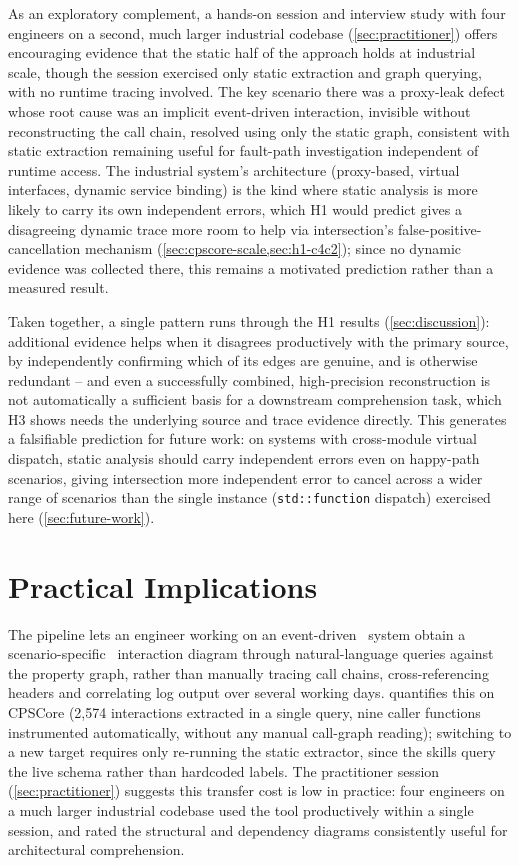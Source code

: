 As an exploratory complement, a hands-on session and interview study with
four engineers on a second, much larger industrial codebase
(\cref{sec:practitioner}) offers encouraging evidence that the static
half of the approach holds at industrial scale, though the session
exercised only static extraction and graph querying, with no runtime
tracing involved. The key scenario there was a proxy-leak defect whose
root cause was an implicit event-driven interaction, invisible without
reconstructing the call chain, resolved using only the static graph,
consistent with static extraction remaining useful for fault-path
investigation independent of runtime access. The industrial system's
architecture (proxy-based, virtual interfaces, dynamic service binding)
is the kind where static analysis is more likely to carry its own
independent errors, which H1 would predict gives a disagreeing dynamic
trace more room to help via intersection's false-positive-cancellation
mechanism (\cref{sec:cpscore-scale,sec:h1-c4c2}); since no dynamic
evidence was collected there, this remains a motivated prediction rather
than a measured result.

Taken together, a single pattern runs through the H1 results
(\cref{sec:discussion}): additional evidence helps when it disagrees
productively with the primary source, by independently confirming which
of its edges are genuine, and is otherwise redundant -- and even a
successfully combined, high-precision reconstruction is not automatically
a sufficient basis for a downstream comprehension task, which H3 shows
needs the underlying source and trace evidence directly. This generates a
falsifiable prediction for future work: on systems with cross-module
virtual dispatch, static analysis should carry independent errors even
on happy-path scenarios, giving intersection more independent error to
cancel across a wider range of scenarios than the single instance
(\texttt{std::function} dispatch) exercised here
(\cref{sec:future-work}).

\section{Practical Implications}

The pipeline lets an engineer working on an event-driven \Cpp\ system
obtain a scenario-specific \sysml\ interaction diagram through
natural-language queries against the property graph, rather than
manually tracing call chains, cross-referencing headers and correlating
log output over several working days.  quantifies this
on CPSCore (2,574 interactions extracted in a single query, nine caller
functions instrumented automatically, without any manual call-graph
reading); switching to a new target requires only re-running the static
extractor, since the skills query the live schema rather than hardcoded
labels. The practitioner session (\cref{sec:practitioner}) suggests this
transfer cost is low in practice: four engineers on a much larger
industrial codebase used the tool productively within a single session,
and rated the structural and dependency diagrams consistently useful for
architectural comprehension.

